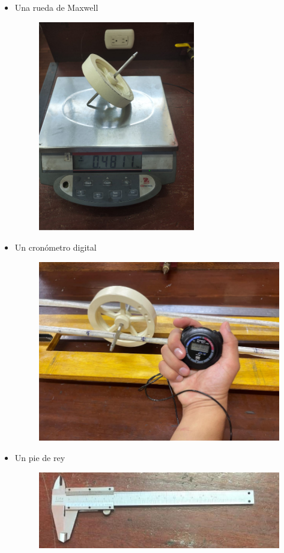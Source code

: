 \documentclass[10pt]{article}
\begin{document}
\begin{itemize}
  \item Una rueda de Maxwell
\begin{figure}[H]
    \centering
\includegraphics[scale = 0.40, center]{rueda}
\end{figure}
  \item Un cronómetro digital
\begin{figure}[H]
    \centering
\includegraphics[scale = 0.40, center]{cronometro}
\end{figure}
  \item Un pie de rey
\begin{figure}[H]
    \centering
\includegraphics[scale = 0.40, center]{vernier}

\end{figure}
\end{itemize}
\end{document}
